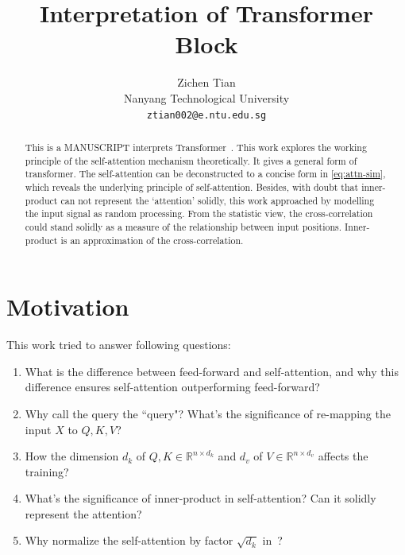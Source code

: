 \documentclass[final]{cvpr}
\begin{document}
\title{Interpretation of Transformer Block}

\author{Zichen Tian\\
Nanyang Technological University\\
{\tt\small ztian002@e.ntu.edu.sg}
}

\maketitle


\begin{abstract}
This is a MANUSCRIPT interprets Transformer~\cite{vaswani2017attention}. This work explores the working principle of the self-attention mechanism theoretically. It gives a general form of transformer. The self-attention can be deconstructed to a concise form in \autoref{eq:attn-sim}, which reveals the underlying principle of self-attention. Besides, with doubt that inner-product can not represent the `attention' solidly, this work approached by modelling the input signal as random processing. From the statistic view, the cross-correlation could stand solidly as a measure of the relationship between input positions. Inner-product is an approximation of the cross-correlation.
\end{abstract}

\section{Motivation}
This work tried to answer following questions: 
\begin{enumerate}
    \item What is the difference between feed-forward and self-attention, and why this difference ensures self-attention outperforming feed-forward? 
    \item Why call the query the ``query"? What's the significance of re-mapping the input $X$ to $Q,K,V$? 
    \item How the dimension $d_k$ of $Q,K\in{\mathbb{R}^{n\times{d_k}}}$ and $d_v$ of $V\in{\mathbb{R}^{n\times{d_v}}}$ affects the training?
    \item What's the significance of inner-product in self-attention? Can it solidly represent the attention?
    \item Why normalize the self-attention by factor $\sqrt{d_k}$ in~\cite{vaswani2017attention}?
\end{enumerate}
\end{document}
